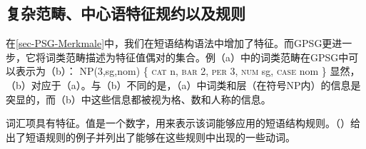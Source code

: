 \subsection{复杂范畴、中心语特征规约以及\xbarc 规则}
\label{sec-complex-categories-gpsg}

在\ref{sec-PSG-Merkmale}中，我们在短语结构语法中增加了特征。而GPSG更进一步，它将词类范畴描述为特征值偶对的集合。例（a）中的词类范畴在GPSG中可以表示为（b）：
\eal
\ex NP(3,sg,{nom})
\ex \{ \textsc{cat} n, \textsc{bar} 2, \textsc{per} 3, \textsc{num} sg, \textsc{case} nom \} 
\zl
显然，（b）对应于（a）。与（b）不同的是，（a）中词类和\xbarc 层（在符号NP内）的信息是突显的，而（b）中这些信息都被视为格、数和人称的信息。

词汇项具有\subcatc 特征。值是一个数字，用来表示该词能够应用的短语结构规则。（）给出了短语规则的例子并列出了能够在这些规则中出现的一些动词。

